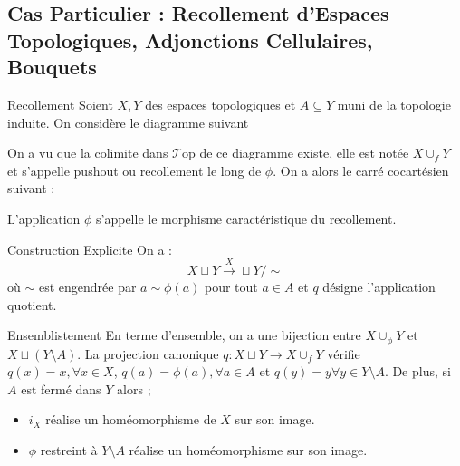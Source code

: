 \documentclass{cours}
\newcommand{\Top}{\mathcal{T}\mathrm{op}}
\begin{document}
\subsection{Cas Particulier : Recollement d'Espaces Topologiques, Adjonctions Cellulaires, Bouquets}
\begin{définition}{Recollement}{}
Soient $X, Y$ des espaces topologiques et $A \subseteq Y$ muni de la topologie induite. On considère le diagramme suivant
\begin{center}
\end{center}
On a vu que la colimite dans $\Top$ de ce diagramme existe, elle est notée $X \cup_{f} Y$ et s'appelle pushout ou recollement le long de $\phi$. On a alors le carré cocartésien suivant : 
\begin{center}
\end{center}
L'application $\phi$ s'appelle le morphisme caractéristique du recollement. 
\end{définition}

\begin{propositionfr}{Construction Explicite}{}
    On a : 
    \[
        X \sqcup Y \xrightarrow X \sqcup Y / \sim
    \]
    où $\sim$ est engendrée par $a \sim \phi(a)$ pour tout $a \in A$ et $q$ désigne l'application quotient. 
\end{propositionfr}

\begin{propositionfr}{Ensemblistement}{}
    En terme d'ensemble, on a une bijection entre $X \cup_{\phi} Y$ et $X \sqcup \left(Y \setminus A\right)$. La projection canonique $q : X \sqcup Y \to X \cup_{f}Y$ vérifie $q(x) = x, \forall x \in X$, $q(a) = \phi(a), \forall a \in A$ et $q(y) = y \forall y \in Y\setminus A$. De plus, si $A$ est fermé dans $Y$ alors ; 
    \begin{itemize}
        \item $i_{X}$ réalise un homéomorphisme de $X$ sur son image.
        \item $\phi$ restreint à $Y \setminus A$ réalise un homéomorphisme sur son image. 
    \end{itemize}
\end{propositionfr}
\end{document}
